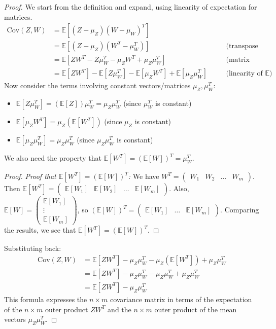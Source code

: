 \documentclass[11pt]{article}
\theoremstyle{definition}
\newcommand{\E}{\mathbb{E}}
\newcommand{\Cov}{\mathrm{Cov}}
\begin{document}
\begin{proof}
We start from the definition and expand, using linearity of expectation for matrices.
\begin{align*}
\Cov(Z, W) &= \E[ (Z - \mu_Z) (W - \mu_W)^T ] \\
&= \E[ (Z - \mu_Z) (W^T - \mu_W^T) ] \quad &&\text{(transpose property)} \\
&= \E[ Z W^T - Z \mu_W^T - \mu_Z W^T + \mu_Z \mu_W^T ] \quad &&\text{(matrix distributivity)} \\
&= \E[Z W^T] - \E[Z \mu_W^T] - \E[\mu_Z W^T] + \E[\mu_Z \mu_W^T] \quad &&\text{(linearity of } \E)
\end{align*}
Now consider the terms involving constant vectors/matrices $\mu_Z, \mu_W^T$:
\begin{itemize}
    \item $\E[Z \mu_W^T] = (\E[Z]) \mu_W^T = \mu_Z \mu_W^T$ (since $\mu_W^T$ is constant)
    \item $\E[\mu_Z W^T] = \mu_Z (\E[W^T])$ (since $\mu_Z$ is constant)
    \item $\E[\mu_Z \mu_W^T] = \mu_Z \mu_W^T$ (since $\mu_Z \mu_W^T$ is constant)
\end{itemize}
We also need the property that $\E[W^T] = (\E[W])^T = \mu_W^T$.
\begin{proof}
\textit{Proof that $\E[W^T] = (\E[W])^T$:}
We have $W^T = \begin{pmatrix} W_1 & W_2 & \dots & W_m \end{pmatrix}$.
Then $\E[W^T] = \begin{pmatrix} \E[W_1] & \E[W_2] & \dots & \E[W_m] \end{pmatrix}$.
Also, $\E[W] = \begin{pmatrix} \E[W_1] \\ \vdots \\ \E[W_m] \end{pmatrix}$, so $(\E[W])^T = \begin{pmatrix} \E[W_1] & \dots & \E[W_m] \end{pmatrix}$.
Comparing the results, we see that $\E[W^T] = (\E[W])^T$.
\end{proof}
Substituting back:
\begin{align*}
\Cov(Z, W) &= \E[Z W^T] - \mu_Z \mu_W^T - \mu_Z (\E[W^T]) + \mu_Z \mu_W^T \\
&= \E[Z W^T] - \mu_Z \mu_W^T - \mu_Z \mu_W^T + \mu_Z \mu_W^T \\
&= \E[Z W^T] - \mu_Z \mu_W^T
\end{align*}
This formula expresses the $n \times m$ covariance matrix in terms of the expectation of the $n \times m$ outer product $Z W^T$ and the $n \times m$ outer product of the mean vectors $\mu_Z \mu_W^T$.
\end{proof}
\end{document}

